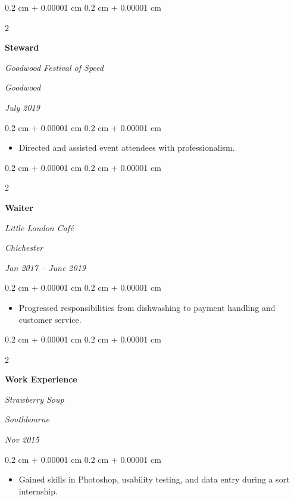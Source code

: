 \documentclass[10pt, letterpaper]{article}
\newenvironment{highlights}{
    \begin{itemize}[
        topsep=0.10 cm,
        parsep=0.10 cm,
        partopsep=0pt,
        itemsep=0pt,
        leftmargin=0.4 cm + 10pt
    ]
}{
    \end{itemize}
} %
\newenvironment{onecolentry}{
    \begin{adjustwidth}{
        0.2 cm + 0.00001 cm
    }{
        0.2 cm + 0.00001 cm
    }
}{
    \end{adjustwidth}
} %
\newenvironment{twocolentry}[2][]{
    \onecolentry
    \def\secondColumn{#2}
    \setcolumnwidth{\fill, 4.5 cm}
    \begin{paracol}{2}
}{
    \switchcolumn \raggedleft \secondColumn
    \end{paracol}
    \endonecolentry
} %
\begin{document}
        \vspace{0.2 cm}

        \begin{twocolentry}{
        \textit{Goodwood}    
            
        \textit{July 2019}}
            \textbf{Steward}
            
            \textit{Goodwood Festival of Speed}
        \end{twocolentry}

        \vspace{0.10 cm}
        \begin{onecolentry}
            \begin{highlights}
                \item Directed and assisted event attendees with professionalism.
            \end{highlights}
        \end{onecolentry}


        \vspace{0.2 cm}

        \begin{twocolentry}{
        \textit{Chichester}    
            
        \textit{Jan 2017 – June 2019}}
            \textbf{Waiter}
            
            \textit{Little London Café}
        \end{twocolentry}

        \vspace{0.10 cm}
        \begin{onecolentry}
            \begin{highlights}
                \item Progressed responsibilities from dishwashing to payment handling and customer service.
            \end{highlights}
        \end{onecolentry}


        \vspace{0.2 cm}

        \begin{twocolentry}{
        \textit{Southbourne}    
            
        \textit{Nov 2015}}
            \textbf{Work Experience}
            
            \textit{Strawberry Soup}
        \end{twocolentry}

        \vspace{0.10 cm}
        \begin{onecolentry}
            \begin{highlights}
                \item Gained skills in Photoshop, usability testing, and data entry during a sort internship.
            \end{highlights}
        \end{onecolentry}



    
\end{document}
